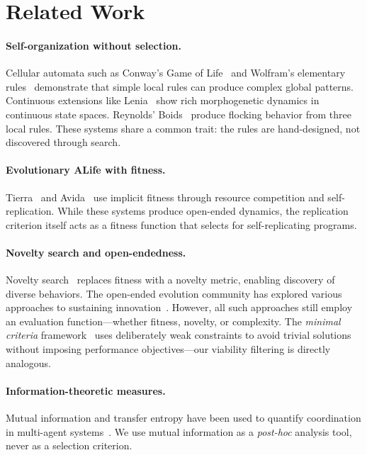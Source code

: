 \documentclass[letterpaper]{article}
\begin{document}
\section{Related Work}

\paragraph{Self-organization without selection.}
Cellular automata such as Conway's Game of Life~\citep{gardner1970game} and
Wolfram's elementary rules~\citep{wolfram1984cellular} demonstrate that simple
local rules can produce complex global patterns. Continuous extensions like
Lenia~\citep{chan2019lenia} show rich morphogenetic dynamics in continuous
state spaces. Reynolds' Boids~\citep{reynolds1987flocks} produce flocking
behavior from three local rules. These systems share a common trait: the rules
are hand-designed, not discovered through search.

\paragraph{Evolutionary ALife with fitness.}
Tierra~\citep{ray1991approach} and Avida~\citep{ofria2004avida} use implicit
fitness through resource competition and self-replication. While these systems
produce open-ended dynamics, the replication criterion itself acts as a fitness
function that selects for self-replicating programs.

\paragraph{Novelty search and open-endedness.}
Novelty search~\citep{lehman2011abandoning, lehman2008exploiting} replaces
fitness with a novelty metric, enabling discovery of diverse
behaviors. The open-ended evolution community has explored various
approaches to sustaining innovation~\citep{taylor2016open,
stanley2019openended}. However, all such approaches still employ an evaluation
function---whether fitness, novelty, or complexity.
The \emph{minimal criteria} framework~\citep{lehman2011abandoning} uses
deliberately weak constraints to avoid trivial solutions without imposing
performance objectives---our viability filtering is directly analogous.

\paragraph{Information-theoretic measures.}
Mutual information and transfer entropy have been used to quantify coordination
in multi-agent systems~\citep{lizier2012local}.
We use mutual information as a \emph{post-hoc} analysis tool, never as a
selection criterion.
\end{document}

